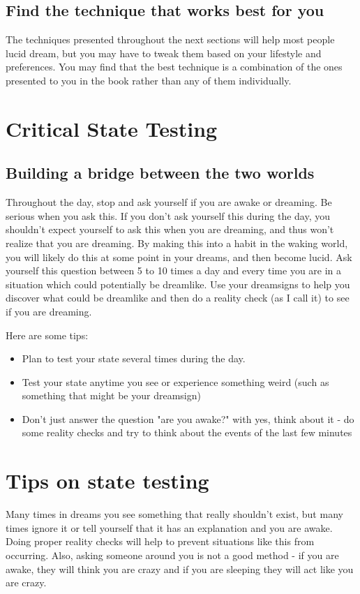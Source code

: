 \documentclass{book}
\begin{document}
\subsection{Find the technique that works best for you}
The techniques presented throughout the next sections will help most people lucid dream, but you may have to tweak them based on your lifestyle and preferences. You may find that the best technique is a combination of the ones presented to you in the book rather than any of them individually.

\section{Critical State Testing}
\subsection{Building a bridge between the two worlds}
Throughout the day, stop and ask yourself if you are awake or dreaming. Be serious when you ask this. If you don't ask yourself this during the day, you shouldn't expect yourself to ask this when you are dreaming, and thus won't realize that you are dreaming. By making this into a habit in the waking world, you will likely do this at some point in your dreams, and then become lucid. Ask yourself this question between 5 to 10 times a day and every time you are in a situation which could potentially be dreamlike. Use your dreamsigns to help you discover what could be dreamlike and then do a reality check (as I call it) to see if you are dreaming.

Here are some tips:
\begin{itemize}
  \item Plan to test your state several times during the day.
  \item Test your state anytime you see or experience something weird (such as something that might be your dreamsign)
  \item Don't just answer the question "are you awake?" with yes, think about it - do some reality checks and try to think about the events of the last few minutes
\end{itemize}

\section{Tips on state testing}
Many times in dreams you see something that really shouldn't exist, but many times ignore it or tell yourself that it has an explanation and you are awake. Doing proper reality checks will help to prevent situations like this from occurring. Also, asking someone around you is not a good method - if you are awake, they will think you are crazy and if you are sleeping they will act like you are crazy.
\end{document}
